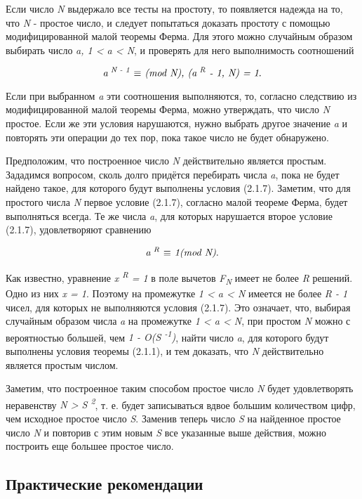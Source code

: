 Если число \textit{N} выдержало все тесты на простоту, то появляется надежда на то, что \textit{N} - простое число, и следует попытаться 
доказать простоту с помощью модифицированной малой теоремы Ферма. Для этого можно случайным образом выбирать число \textit{a, 1 < a < N},
и проверять для него выполнимость соотношений

  \begin{equation}
    \textit{a\textsuperscript{ N - 1} {$\equiv$} (mod N), (a\textsuperscript{ R} - 1, N) = 1}.
  \end{equation}
  
  Если при выбранном \textit{a} эти соотношения выполняются, то, согласно следствию из модифицированной малой теоремы Ферма, можно 
утверждать, что число \textit{N} простое. Если же эти условия нарушаются, нужно выбрать другое значение \textit{a} и повторять 
эти операции до тех пор, пока такое число не будет обнаружено.

  Предположим, что построенное число \textit{N} действительно является простым. Зададимся вопросом, сколь долго придётся 
перебирать числа \textit{a}, пока не будет найдено такое, для которого будут выполнены условия (2.1.7). Заметим, что для простого числа \textit{N}
первое условие (2.1.7), согласно малой теореме Ферма, будет выполняться всегда. Те же числа \textit{a}, для которых нарушается второе 
условие (2.1.7), удовлетворяют сравнению

  \begin{equation}
   \textit{a\textsuperscript{ R} {$\equiv$} 1(mod N)}.
  \end{equation}

Как известно, уравнение \textit{x\textsuperscript{ R} = 1} в поле вычетов \textit{F\textsubscript{N}} имеет не более \textit{R} решений. 
Одно из них \textit{x = 1}. Поэтому на промежутке \textit{1 < a < N} имеется не более \textit{R - 1} чисел, для которых не выполняются 
условия (2.1.7). Это означает, что, выбирая случайным образом числа \textit{a} на промежутке \textit{1 < a < N}, при простом \textit{N}
можно с вероятностью большей, чем \textit{1 - O(S\textsuperscript{ -1})}, найти число \textit{a}, для которого будут выполнены условия 
теоремы (2.1.1), и тем доказать, что \textit{N} действительно является простым числом.

  Заметим, что построенное таким способом простое число \textit{N} будет удовлетворять неравенству \textit{N > S\textsuperscript{ 2}}, 
т. е. будет записываться вдвое большим количеством цифр, чем исходное простое число \textit{S}. Заменив теперь число \textit{S} на 
найденное простое число \textit{N} и повторив с этим новым \textit{S} все указанные выше действия, можно построить еще большее простое 
число.

\subsection{Практические рекомендации}

  
  
